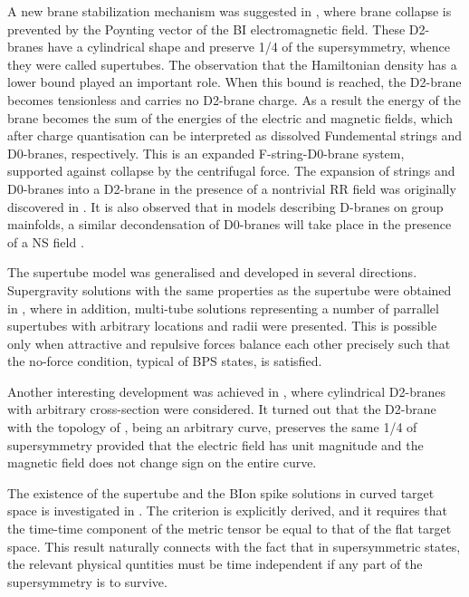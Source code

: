 \documentclass[a4paper,12pt]{article}
\begin{document}
A new brane stabilization mechanism was suggested in \cite{tub}, where brane collapse is prevented by the Poynting vector of the BI electromagnetic field. These D2-branes have a cylindrical shape and preserve 1/4 of the supersymmetry, whence they were called supertubes. The observation that the Hamiltonian density has a lower bound played an important role. When this bound is reached, the D2-brane becomes tensionless and carries no D2-brane charge. As a result the energy of the brane becomes the sum of the energies of the electric and magnetic fields, which after charge quantisation can be interpreted as dissolved Fundemental strings and D0-branes, respectively. This is an expanded F-string-D0-brane system, supported against collapse by the centrifugal force. The expansion of strings and D0-branes into a D2-brane in the presence of a nontrivial RR field was originally discovered in \cite{tunl,my}. It is also observed that in models describing D-branes on group mainfolds, a similar decondensation of D0-branes will take place in the presence of a NS field \cite{bach,tay,my2}.

The supertube model was generalised and developed in several directions. Supergravity solutions with the same properties as the supertube were obtained in \cite{emt}, where in addition, multi-tube solutions representing a number of parrallel supertubes with arbitrary locations and radii were presented. This is possible only when attractive and repulsive forces balance each other precisely such that the no-force condition, typical of BPS states, is satisfied. 

Another interesting development was achieved in \cite{bak1}, where cylindrical D2-branes with arbitrary cross-section were considered. It turned out that the D2-brane with the topology of \coordHE{}, \coordHE{} being an arbitrary curve, preserves the same 1/4 of supersymmetry provided that the electric field has unit magnitude and the magnetic field does not change sign on the entire curve.

The existence of the supertube and the BIon spike solutions in curved target space is investigated in \cite{cts}. The criterion is explicitly derived, and it requires that the time-time component of the metric tensor be equal to that of the flat target space. This result naturally connects with the fact that in supersymmetric states, the relevant physical quntities must be time independent if any part of the supersymmetry is to survive.
\end{document}
